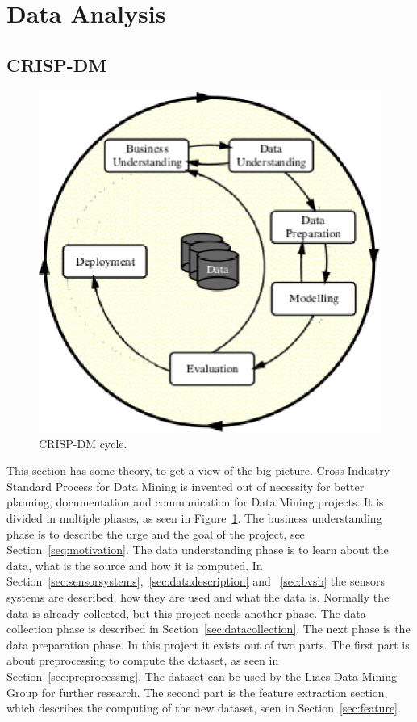 \section{Data Analysis}
	\subsection{CRISP-DM}
	\label{sec:datamodeling}
	\begin{figure}[h]
		\centering
		\includegraphics[scale=0.75]{crispdm.eps}
					
		\caption{CRISP-DM \cite{wirth2000crisp} cycle.}
		\label{fig:crispdm}

	\end{figure}
	This section has some theory, to get a view of the big picture. Cross Industry Standard Process for Data Mining \cite{wirth2000crisp} is invented out of necessity for better planning, documentation and communication for Data Mining projects. It is divided in multiple phases, as seen in Figure~\ref{fig:crispdm}. The business understanding phase is to describe the urge and the goal of the project, see Section~\ref{seq:motivation}. The data understanding phase is to learn about the data, what is the source and how it is computed. In Section~\ref{sec:sensorsystems},~\ref{sec:datadescription} and ~\ref{sec:bvsb} the sensors systems are described, how they are used and what the data is. Normally the data is already collected, but this project needs another phase. The data collection phase is described in Section~\ref{sec:datacollection}. The next phase is the data preparation phase. In this project it exists out of two parts. The first part is about preprocessing to compute the dataset, as seen in Section~\ref{sec:preprocessing}. The dataset can be used by the Liacs Data Mining Group for further research. The second part is the feature extraction section, which describes the computing of the new dataset, seen in Section~\ref{sec:feature}. 
